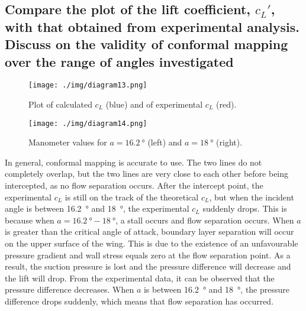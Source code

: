 \subsection{Compare the plot of the lift coefficient, $c_L'$, with that obtained from experimental analysis. Discuss on the validity of conformal mapping over the range of angles investigated}
\begin{figure}[H]
    \centering
    \texttt{[image: ./img/diagram13.png]}
    \caption{Plot of calculated $c_L$ (blue) and of experimental $c_L$ (red).}
\end{figure}
\begin{figure}[H]
    \centering
    \texttt{[image: ./img/diagram14.png]}
    \caption{Manometer values for $a=\SI{16.2}{\degree}$ (left) and $a = \SI{18}{\degree}$ (right).}
\end{figure}
In general, conformal mapping is accurate to use. The two lines do not completely overlap, but the two lines are very close to each other before being intercepted, as no flow separation occurs. After the intercept point, the experimental $c_L$ is still on the track of the theoretical $c_L$, but when the incident angle is between \SI{16.2}{\degree} and \SI{18}{\degree}, the experimental $c_L$ suddenly drops. This is because when $a=\SI{16.2}{\degree}-\SI{18}{\degree}$, a stall occurs and flow separation occurs. When $a$ is greater than the critical angle of attack, boundary layer separation will occur on the upper surface of the wing. This is due to the existence of an unfavourable pressure gradient and wall stress equals zero at the flow separation point. As a result, the suction pressure is lost and the pressure difference will decrease and the lift will drop. From the experimental data, it can be observed that the pressure difference decreases. When $a$ is between \SI{16.2}{\degree} and \SI{18}{\degree}, the pressure difference drops suddenly, which means that flow separation has occurred.